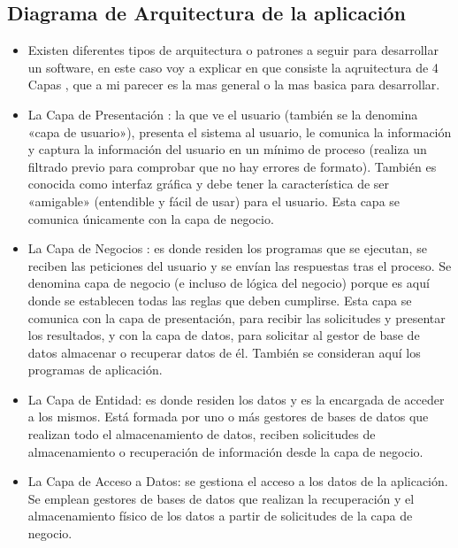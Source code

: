 \documentclass[preprint,12pt]{elsarticle}
\begin{document}
\subsection{\textbf{ Diagrama de Arquitectura de la aplicación }}



\begin{itemize}
\item Existen diferentes tipos de arquitectura o patrones a seguir para desarrollar un software, en este caso voy a explicar en que consiste la aqruitectura de 4 Capas , que a mi parecer es la mas general o la mas basica para desarrollar.
\item La Capa de Presentación : la que ve el usuario (también se la denomina «capa de usuario»), presenta el sistema al usuario, le comunica la información y captura la información del usuario en un mínimo de proceso (realiza un filtrado previo para comprobar que no hay errores de formato). También es conocida como interfaz gráfica y debe tener la característica de ser «amigable» (entendible y fácil de usar) para el usuario. Esta capa se comunica únicamente con la capa de negocio.
\item La Capa de Negocios  : es donde residen los programas que se ejecutan, se reciben las peticiones del usuario y se envían las respuestas tras el proceso. Se denomina capa de negocio (e incluso de lógica del negocio) porque es aquí donde se establecen todas las reglas que deben cumplirse. Esta capa se comunica con la capa de presentación, para recibir las solicitudes y presentar los resultados, y con la capa de datos, para solicitar al gestor de base de datos almacenar o recuperar datos de él. También se consideran aquí los programas de aplicación.
\item La Capa de Entidad: es donde residen los datos y es la encargada de acceder a los mismos. Está formada por uno o más gestores de bases de datos que realizan todo el almacenamiento de datos, reciben solicitudes de almacenamiento o recuperación de información desde la capa de negocio.
\item La Capa de Acceso a Datos: se gestiona el acceso a los datos de la aplicación. Se emplean gestores de bases de datos que realizan la recuperación y el almacenamiento físico de los datos a partir de solicitudes de la capa de negocio.
	
	\end{itemize}
\end{document}
